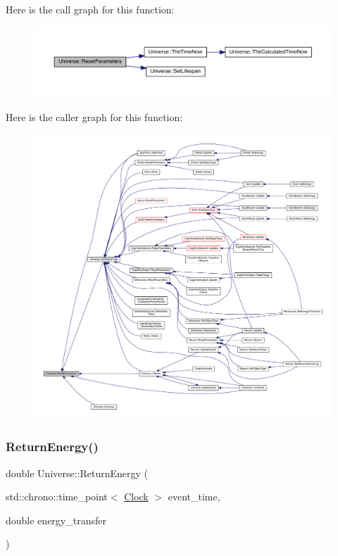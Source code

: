 Here is the call graph for this function\+:
\nopagebreak
\begin{figure}[H]
\begin{center}
\leavevmode
\includegraphics[width=350pt]{class_universe_a1d92b2277564577571c802f6e0c206dd_cgraph}
\end{center}
\end{figure}
Here is the caller graph for this function\+:
\nopagebreak
\begin{figure}[H]
\begin{center}
\leavevmode
\includegraphics[width=350pt]{class_universe_a1d92b2277564577571c802f6e0c206dd_icgraph}
\end{center}
\end{figure}
\mbox{\label{class_universe_aeda74e3902c0e56c0c09779854045cde}} 
\subsubsection{\texorpdfstring{Return\+Energy()}{ReturnEnergy()}}
{\footnotesize\ttfamily double Universe\+::\+Return\+Energy (\begin{DoxyParamCaption}\item[{std\+::chrono\+::time\+\_\+point$<$ \hyperlink{universe_8h_a0ef8d951d1ca5ab3cfaf7ab4c7a6fd80}{Clock} $>$}]{event\+\_\+time,  }\item[{double}]{energy\+\_\+transfer }\end{DoxyParamCaption})}



